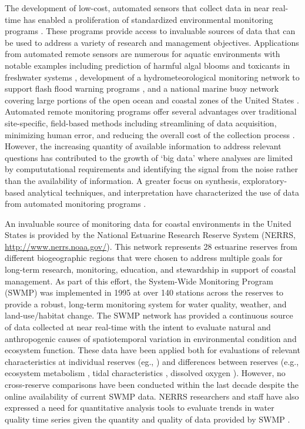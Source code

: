 The development of low-cost, automated sensors that collect data in near real-time has enabled a proliferation of standardized environmental monitoring programs \cite{Glasgow04,Fries08}.  These programs provide access to invaluable sources of data that can be used to address a variety of research and management objectives.  Applications from automated remote sensors are numerous for aquatic environments with notable examples including prediction of harmful algal blooms and toxicants in freshwater systems \cite{Reed10}, development of a hydrometeorological monitoring network to support flash flood warning programs \cite{HADS15}, and a national marine buoy network covering large portions of the open ocean and coastal zones of the United States \cite{NDBC15}.  Automated remote monitoring programs offer several advantages over traditional site-specific, field-based methods including streamlining of data acquisition, minimizing human error, and reducing the overall cost of the collection process \cite{Glasgow04}.  However, the increasing quantity of available information to address relevant questions has contributed to the growth of `big data' where analyses are limited by compututational requirements and identifying the signal from the noise rather than the availability of information. A greater focus on synthesis, exploratory-based analytical techniques, and interpretation have characterized the use of data from automated monitoring programs \cite{Campbell13,Millie13}.

An invaluable source of monitoring data for coastal environments in the United States is provided by the National Estuarine Research Reserve System (NERRS, \url{http://www.nerrs.noaa.gov/}).  This network represents 28 estuarine reserves from different biogeographic regions that were chosen to address multiple goals for long-term research, monitoring, education, and stewardship in support of coastal management.  As part of this effort, the System-Wide Monitoring Program (SWMP) was implemented in 1995 at over 140 stations across the reserves to provide a robust, long-term monitoring system for water quality, weather, and land-use/habitat change.  The SWMP network has provided a continuous source of data collected at near real-time with the intent to evaluate natural and anthropogenic causes of spatiotemporal variation in environmental condition and ecosystem function.  These data have been applied both for evaluations of relevant characteristics at individual reserves (eg., \cite{Bulthius95,Dix08}) and differences between reserves (e.g., ecosystem metabolism \cite{Caffrey03,Caffrey04}, tidal characteristics \cite{Sanger02}, dissolved oxygen \cite{Wenner04}).  However, no cross-reserve comparisons have been conducted within the last decade despite the online availability of current SWMP data.  NERRS researchers and staff have also expressed a need for quantitative analysis tools to evaluate trends in water quality time series given the quantity and quality of data provided by SWMP \cite{SWMP14}.          


